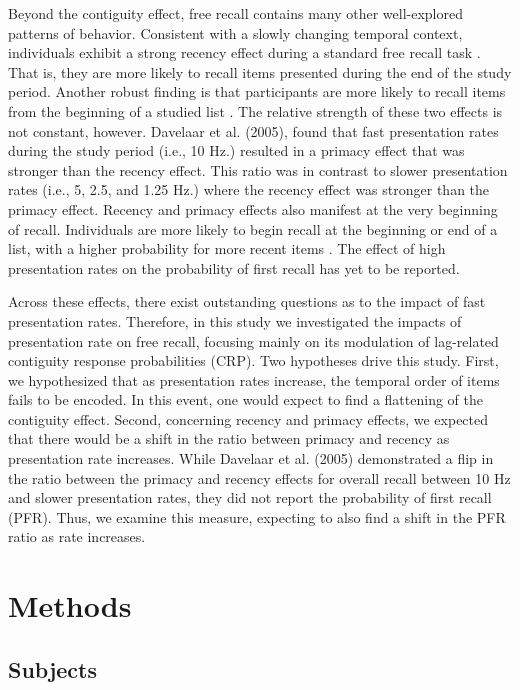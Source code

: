 \documentclass[10pt,letterpaper]{article}
\begin{document}
Beyond the contiguity effect, free recall contains many other well-explored patterns of behavior. Consistent with a slowly changing temporal context, individuals exhibit a strong recency effect during a standard free recall task \cite{SedeEtal08}. 
That is, they are more likely to recall items presented during the end of the study period. Another robust finding is that participants are more likely to recall items from the beginning of a studied list \cite{Murd62}. 
The relative strength of these two effects is not constant, however. Davelaar et al. (2005), found that fast presentation rates during the study period (i.e., 10 Hz.) resulted in a primacy effect that was stronger than the recency effect. 
This ratio was in contrast to slower presentation rates (i.e., 5, 2.5, and 1.25 Hz.) where the recency effect was stronger than the primacy effect. 
Recency and primacy effects also manifest at the very beginning of recall. Individuals are more likely to begin recall at the beginning or end of a list, with a higher probability for more recent items \cite{HowaKaha99}. The effect of high presentation rates on the probability of first recall has yet to be reported. 

\nocite{DaveEtal05}

Across these effects, there exist outstanding questions as to the impact of fast presentation rates. Therefore, in this study we investigated the impacts of presentation rate on free recall, focusing mainly on its modulation of lag-related contiguity response probabilities (CRP). Two hypotheses drive this study. First, we hypothesized that as presentation rates increase, the temporal order of items fails to be encoded. In this event, one would expect to find a flattening of the contiguity effect. Second, concerning recency and primacy effects, we expected that there would be a shift in the ratio between primacy and recency as presentation rate increases. While Davelaar et al. (2005) demonstrated a flip in the ratio between the primacy and recency effects for overall recall between 10 Hz and slower presentation rates, they did not report the probability of first recall (PFR). Thus, we examine this measure, expecting to also find a shift in the PFR ratio as rate increases. 

\nocite{DaveEtal05}

\section{Methods}

\subsection{Subjects}
\end{document}
